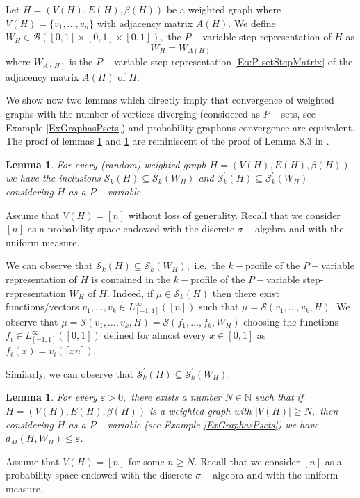 \documentclass[11pt]{article}
\newtheorem{lemma}[theorem]{Lemma}
\def\N{\mathbb{N}}
\newcommand{\cB}{{\mathcal B}}  %
\begin{document}
Let $H=(V(H),E(H),\beta(H))$ be a weighted graph where $V(H)=\{v_1,\ldots, v_n\}$ with adjacency matrix $A(H).$ We define $W_H\in \cB([0,1]\times [0,1]\times [0,1]),$ the $P-$variable step-representation of $H$ as  
\begin{equation*}
    W_H=W_{A(H)}
\end{equation*}
where $W_{A(H)}$ is the $P-$variable step-representation \eqref{Eq:P-setStepMatrix} of the adjacency matrix $A(H)$ of $H.$


We show now two lemmas which directly imply that convergence of weighted graphs with the number of vertices diverging (considered as $P-$sets, see Example \ref{ExGraphasPsets}) and probability graphons convergence are equivalent. The proof of lemmas \ref{InclusionskProfP-setsGraphs} and \ref{LemmApproxGraphPset} are reminiscent of the proof of Lemma 8.3 in \cite{backhausz2018action}.

\begin{lemma}\label{InclusionskProfP-setsGraphs}
For every (random) weighted graph $H=(V(H),E(H),\beta(H))$ we have the inclusions $\mathcal{S}_k(H)\subseteq \mathcal{S}_k( W_H)$ and $\mathcal{S}^{\prime}_k(H)\subseteq \mathcal{S}^{\prime}_k( W_H)$ considering $H$ as a $P-$variable.      
\end{lemma}
\proof
Assume that $V(H)=[n]$ without loss of generality. Recall that we consider $[n]$ as a probability space endowed with the discrete $\sigma-$algebra and with the uniform measure. 

We can observe that $\mathcal{S}_k(H)\subseteq \mathcal{S}_k( W_H),$ i.e.\ the $k-$profile of the $P-$variable representation of $H$ is contained in the $k-$profile of the $P-$variable step-representation $W_H$ of $H$. Indeed, if $\mu\in\mathcal{S}_k(H)$ then there exist functions/vectors $v_1,\ldots, v_k\in L_{[-1,1]}^{\infty}([n])$ such that $\mu=\mathcal{S}(v_1,\ldots,v_k,H).$ We observe that $\mu=\mathcal{S}(v_1,\ldots,v_k,H)=\mathcal{S}(f_1,\ldots,f_k,W_H)$ choosing the functions $f_i\in L_{[-1,1]}^{\infty}([0,1])$ defined for almost every $x\in [0,1]$ as $f_i(x)=v_i(\lceil xn\rceil).$ 

Similarly, we can observe that $\mathcal{S}^{\prime}_k(H)\subseteq \mathcal{S}^{\prime}_k( W_H).$
\endproof

\begin{lemma}\label{LemmApproxGraphPset} For every $\varepsilon>0,$ there exists a number $N\in \N$ such that if $H=(V(H),E(H),\beta(H))$ is a weighted graph with $|V(H)|\geq N,$ then considering $H$ as a $P-$variable (see Example \ref{ExGraphasPsets}) we have $d_M(H, W_H)\leq\varepsilon$.
\end{lemma}
\proof Assume that $V(H)=[n]$ for some $n\geq N.$ Recall that we consider $[n]$ as a probability space endowed with the discrete $\sigma-$algebra and with the uniform measure. 
\end{document}
